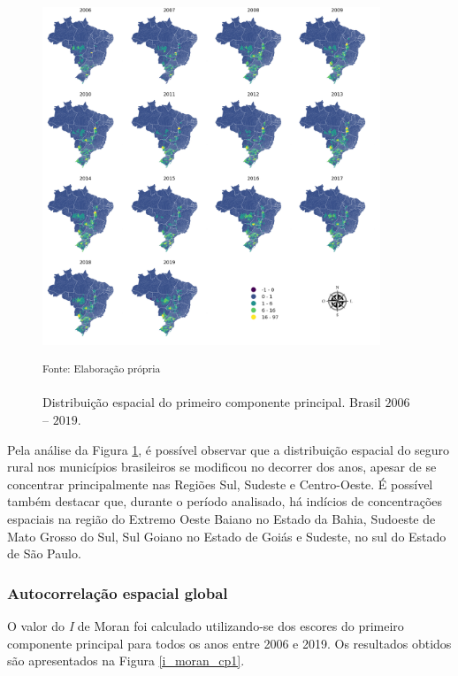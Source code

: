 \begin{figure}[H]
	\centering
	\caption{Distribuição espacial do primeiro componente principal. Brasil $2006$ -- $2019$.}
	\includegraphics[width=0.9\textwidth]{figuras/map_CP1_color.png}	\parbox{\dimexpr\linewidth-2cm}{\raggedright
    \strut \textsuperscript{Fonte: Elaboração própria}\strut}
    \label{map_cp1}
\end{figure}

Pela análise da Figura \ref{map_cp1}, é possível observar que a distribuição espacial do seguro rural nos municípios brasileiros se modificou no decorrer dos anos, apesar de se concentrar principalmente nas Regiões Sul, Sudeste e Centro-Oeste. É possível também destacar que, durante o período analisado, há indícios de concentrações espaciais na região do Extremo Oeste Baiano no Estado da Bahia, Sudoeste de Mato Grosso do Sul, Sul Goiano no Estado de Goiás e Sudeste, no sul do Estado de São Paulo.

\subsubsection{Autocorrelação espacial global}

O valor do \textit{I} de Moran foi calculado utilizando-se dos escores do primeiro componente principal para todos os anos entre 2006 e 2019. Os resultados obtidos são apresentados na Figura \ref{i_moran_cp1}. %

